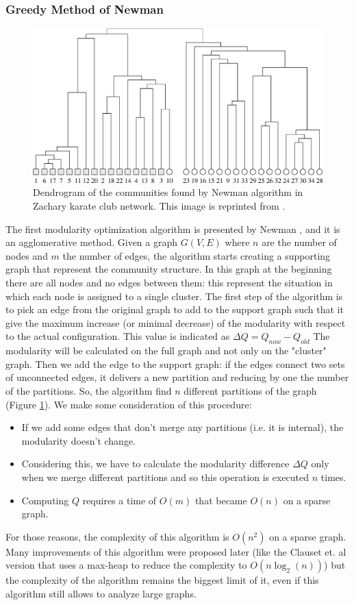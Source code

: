 \subsubsection{Greedy Method of Newman}
\begin{figure}[h]
	\centering
	\includegraphics[width=0.7\linewidth]{0-resources/zachary}
	\caption{Dendrogram of the communities found by Newman algorithm in Zachary karate club network. This image is reprinted from \cite{Newman_greedy}.}
	\label{fig:dedro_zachary}
\end{figure}
The first modularity optimization algorithm is presented by Newman \cite{Newman_greedy},
and it is an agglomerative method. Given a graph $G(V,E)$ where $n$ are the number of nodes and $m$ the number of edges, the algorithm starts creating a supporting graph that represent the community structure. In this graph at the beginning there are all nodes and no edges between them: this represent the situation in which each node is assigned to a single cluster. The first step of the algorithm is to pick an edge from the original graph to add to the support graph such that it give the maximum increase (or minimal decrease) of the modularity with respect to the actual configuration. This value is indicated as $\Delta Q = Q_{now} - Q_{old}$ The modularity will be calculated on the full graph and not only on the "cluster" graph. Then we add the edge to the support graph: if the edges connect two sets of unconnected edges, it delivers a new partition and reducing by one the number of the partitions. So, the algorithm find $n$ different partitions of the graph (Figure \ref{fig:dedro_zachary}). 
We make some consideration of this procedure:
\begin{itemize}
\item If we add some edges that don't merge any partitions (i.e. it is internal), the modularity doesn't change.
\item Considering this, we have to calculate the modularity difference $\Delta Q$ only when we merge different partitions and so this operation is executed $n$ times.
\item Computing $Q$ requires a time of $O(m)$ that became $O(n)$ on a sparse graph.
\end{itemize}
For those reasons, the complexity of this algorithm is $O(n^2)$ on a sparse graph.
Many improvements of this algorithm were proposed later (like the Clauset et. al version \cite{Clauset_2004} that uses a max-heap to reduce the complexity to $O(n \log_2(n))$) but the complexity of the algorithm remains the biggest limit of it, even if this algorithm still allows to analyze large graphs.
